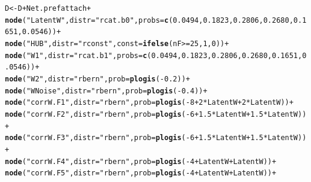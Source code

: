 \documentclass[english]{article}\usepackage[]{graphicx}\usepackage[]{color}
\makeatletter
\newcommand{\hlnum}[1]{\textcolor[rgb]{0.686,0.059,0.569}{#1}}%
\newcommand{\hlstr}[1]{\textcolor[rgb]{0.192,0.494,0.8}{#1}}%
\newcommand{\hlopt}[1]{\textcolor[rgb]{0,0,0}{#1}}%
\newcommand{\hlstd}[1]{\textcolor[rgb]{0.345,0.345,0.345}{#1}}%
\newcommand{\hlkwb}[1]{\textcolor[rgb]{0.69,0.353,0.396}{#1}}%
\newcommand{\hlkwc}[1]{\textcolor[rgb]{0.333,0.667,0.333}{#1}}%
\newcommand{\hlkwd}[1]{\textcolor[rgb]{0.737,0.353,0.396}{\textbf{#1}}}%
\newenvironment{kframe}{%
 \def\at@end@of@kframe{}%
 \ifinner\ifhmode%
  \def\at@end@of@kframe{\end{minipage}}%
  \begin{minipage}{\columnwidth}%
 \fi\fi%
 \def\FrameCommand##1{\hskip\@totalleftmargin \hskip-\fboxsep
 \colorbox{shadecolor}{##1}\hskip-\fboxsep
     \hskip-\linewidth \hskip-\@totalleftmargin \hskip\columnwidth}%
 \MakeFramed {\advance\hsize-\width
   \@totalleftmargin\z@ \linewidth\hsize
   \@setminipage}}%
 {\par\unskip\endMakeFramed%
 \at@end@of@kframe}
\newenvironment{knitrout}{}{} %
\theoremstyle{plain}
\theoremstyle{plain}
\makeatother
\begin{document}
\begin{knitrout}\footnotesize
{}\color{fgcolor}\begin{kframe}
\begin{alltt}
\hlstd{D} \hlkwb{<-} \hlstd{D} \hlopt{+} \hlstd{Net.prefattach} \hlopt{+}
  \hlkwd{node}\hlstd{(}\hlstr{"LatentW"}\hlstd{,} \hlkwc{distr} \hlstd{=} \hlstr{"rcat.b0"}\hlstd{,} \hlkwc{probs} \hlstd{=} \hlkwd{c}\hlstd{(}\hlnum{0.0494}\hlstd{,} \hlnum{0.1823}\hlstd{,} \hlnum{0.2806}\hlstd{,} \hlnum{0.2680}\hlstd{,}\hlnum{0.1651}\hlstd{,} \hlnum{0.0546}\hlstd{))} \hlopt{+}
  \hlkwd{node}\hlstd{(}\hlstr{"HUB"}\hlstd{,} \hlkwc{distr} \hlstd{=} \hlstr{"rconst"}\hlstd{,} \hlkwc{const} \hlstd{=} \hlkwd{ifelse}\hlstd{(nF} \hlopt{>=} \hlnum{25}\hlstd{,} \hlnum{1}\hlstd{,} \hlnum{0}\hlstd{))} \hlopt{+}
  \hlkwd{node}\hlstd{(}\hlstr{"W1"}\hlstd{,} \hlkwc{distr} \hlstd{=} \hlstr{"rcat.b1"}\hlstd{,} \hlkwc{probs} \hlstd{=} \hlkwd{c}\hlstd{(}\hlnum{0.0494}\hlstd{,} \hlnum{0.1823}\hlstd{,} \hlnum{0.2806}\hlstd{,} \hlnum{0.2680}\hlstd{,}\hlnum{0.1651}\hlstd{,} \hlnum{0.0546}\hlstd{))} \hlopt{+}
  \hlkwd{node}\hlstd{(}\hlstr{"W2"}\hlstd{,} \hlkwc{distr} \hlstd{=} \hlstr{"rbern"}\hlstd{,} \hlkwc{prob} \hlstd{=} \hlkwd{plogis}\hlstd{(}\hlopt{-}\hlnum{0.2}\hlstd{))} \hlopt{+}
  \hlkwd{node}\hlstd{(}\hlstr{"WNoise"}\hlstd{,} \hlkwc{distr} \hlstd{=} \hlstr{"rbern"}\hlstd{,} \hlkwc{prob} \hlstd{=} \hlkwd{plogis}\hlstd{(}\hlopt{-}\hlnum{0.4}\hlstd{))} \hlopt{+}
  \hlkwd{node}\hlstd{(}\hlstr{"corrW.F1"}\hlstd{,} \hlkwc{distr} \hlstd{=} \hlstr{"rbern"}\hlstd{,} \hlkwc{prob} \hlstd{=} \hlkwd{plogis}\hlstd{(}\hlopt{-}\hlnum{8} \hlopt{+} \hlnum{2}\hlopt{*}\hlstd{LatentW} \hlopt{+} \hlnum{2}\hlopt{*}\hlstd{LatentW))} \hlopt{+}
  \hlkwd{node}\hlstd{(}\hlstr{"corrW.F2"}\hlstd{,} \hlkwc{distr} \hlstd{=} \hlstr{"rbern"}\hlstd{,} \hlkwc{prob} \hlstd{=} \hlkwd{plogis}\hlstd{(}\hlopt{-}\hlnum{6} \hlopt{+} \hlnum{1.5}\hlopt{*}\hlstd{LatentW} \hlopt{+} \hlnum{1.5}\hlopt{*}\hlstd{LatentW))} \hlopt{+}
  \hlkwd{node}\hlstd{(}\hlstr{"corrW.F3"}\hlstd{,} \hlkwc{distr} \hlstd{=} \hlstr{"rbern"}\hlstd{,} \hlkwc{prob} \hlstd{=} \hlkwd{plogis}\hlstd{(}\hlopt{-}\hlnum{6} \hlopt{+} \hlnum{1.5}\hlopt{*}\hlstd{LatentW} \hlopt{+} \hlnum{1.5}\hlopt{*}\hlstd{LatentW))} \hlopt{+}
  \hlkwd{node}\hlstd{(}\hlstr{"corrW.F4"}\hlstd{,} \hlkwc{distr} \hlstd{=} \hlstr{"rbern"}\hlstd{,} \hlkwc{prob} \hlstd{=} \hlkwd{plogis}\hlstd{(}\hlopt{-}\hlnum{4} \hlopt{+} \hlstd{LatentW} \hlopt{+} \hlstd{LatentW))} \hlopt{+}
  \hlkwd{node}\hlstd{(}\hlstr{"corrW.F5"}\hlstd{,} \hlkwc{distr} \hlstd{=} \hlstr{"rbern"}\hlstd{,} \hlkwc{prob} \hlstd{=} \hlkwd{plogis}\hlstd{(}\hlopt{-}\hlnum{4} \hlopt{+} \hlstd{LatentW} \hlopt{+} \hlstd{LatentW))} \hlopt{+}

\end{alltt}
\end{kframe}
\end{knitrout}
\end{document}
